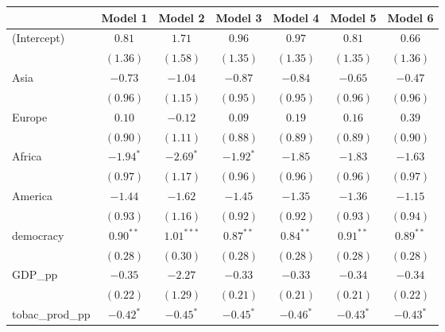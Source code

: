 
\begin{table}[!h]
\begin{center}
\begin{tabular}{l c c c c c c }
\toprule
 & Model 1 & Model 2 & Model 3 & Model 4 & Model 5 & Model 6 \\
\midrule
(Intercept)             & $0.81$       & $1.71$       & $0.96$       & $0.97$       & $0.81$       & $0.66$       \\
                        & $(1.36)$     & $(1.58)$     & $(1.35)$     & $(1.35)$     & $(1.35)$     & $(1.36)$     \\
Asia                    & $-0.73$      & $-1.04$      & $-0.87$      & $-0.84$      & $-0.65$      & $-0.47$      \\
                        & $(0.96)$     & $(1.15)$     & $(0.95)$     & $(0.95)$     & $(0.96)$     & $(0.96)$     \\
Europe                  & $0.10$       & $-0.12$      & $0.09$       & $0.19$       & $0.16$       & $0.39$       \\
                        & $(0.90)$     & $(1.11)$     & $(0.88)$     & $(0.89)$     & $(0.89)$     & $(0.90)$     \\
Africa                  & $-1.94^{*}$  & $-2.69^{*}$  & $-1.92^{*}$  & $-1.85$      & $-1.83$      & $-1.63$      \\
                        & $(0.97)$     & $(1.17)$     & $(0.96)$     & $(0.96)$     & $(0.96)$     & $(0.97)$     \\
America                 & $-1.44$      & $-1.62$      & $-1.45$      & $-1.35$      & $-1.36$      & $-1.15$      \\
                        & $(0.93)$     & $(1.16)$     & $(0.92)$     & $(0.92)$     & $(0.93)$     & $(0.94)$     \\
democracy               & $0.90^{**}$  & $1.01^{***}$ & $0.87^{**}$  & $0.84^{**}$  & $0.91^{**}$  & $0.89^{**}$  \\
                        & $(0.28)$     & $(0.30)$     & $(0.28)$     & $(0.28)$     & $(0.28)$     & $(0.28)$     \\
GDP\_pp                 & $-0.35$      & $-2.27$      & $-0.33$      & $-0.33$      & $-0.34$      & $-0.34$      \\
                        & $(0.22)$     & $(1.29)$     & $(0.21)$     & $(0.21)$     & $(0.21)$     & $(0.22)$     \\
tobac\_prod\_pp         & $-0.42^{*}$  & $-0.45^{*}$  & $-0.45^{*}$  & $-0.46^{*}$  & $-0.43^{*}$  & $-0.43^{*}$  \\

\end{tabular}
\end{center}
\end{table}
